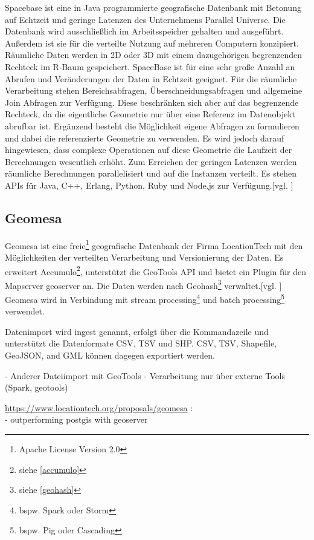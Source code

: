 Spacebase ist eine in Java programmierte geografische Datenbank mit Betonung auf Echtzeit und geringe Latenzen des Unternehmens Parallel Universe.
Die Datenbank wird ausschließlich im Arbeitsspeicher gehalten und ausgeführt.
Außerdem ist sie für die verteilte Nutzung auf mehreren Computern konzipiert.
Räumliche Daten werden in 2D oder 3D mit einem dazugehörigen begrenzenden Rechteck im R-Baum gespeichert.
SpaceBase ist für eine sehr große Anzahl an Abrufen und Veränderungen der Daten in Echtzeit geeignet.
Für die räumliche Verarbeitung stehen Bereichsabfragen, Überschneidungsabfragen und allgemeine Join Abfragen zur Verfügung.
Diese beschränken sich aber auf das begrenzende Rechteck, da die eigentliche Geometrie nur über eine Referenz im Datenobjekt abrufbar ist.
Ergänzend besteht die Möglichkeit eigene Abfragen zu formulieren und dabei die referenzierte Geometrie zu verwenden.
Es wird jedoch darauf hingewiesen, dass complexe Operationen auf diese Geometrie die Laufzeit der Berechnungen wesentlich erhöht.
Zum Erreichen der geringen Latenzen werden räumliche Berechnungen parallelisiert und auf die Instanzen verteilt.
Es stehen APIs für Java, C++, Erlang, Python, Ruby und Node.js zur Verfügung.[vgl. \cite{website:spacebase}]

\subsection{Geomesa}

Geomesa ist eine freie\footnote{Apache License Version 2.0} geografische Datenbank der Firma LocationTech mit den Möglichkeiten der verteilten Verarbeitung und Versionierung der Daten.
Es erweitert Accumulo\footnote{siehe \ref{accumulo}},  unterstützt die GeoTools API und bietet ein Plugin für den Mapserver \Gls{geoserver} an.
Die Daten werden nach Geohash\footnote{siehe \ref{geohash}} verwaltet.[vgl. \cite{website:geomesaeclipse}]\\
Geomesa wird in Verbindung mit stream processing\footnote{bspw. Spark oder Storm} und batch processing\footnote{bspw. Pig oder Cascading} verwendet.

Datenimport wird ingest genannt, erfolgt über die Kommandazeile und unterstützt die Datenformate CSV, TSV und SHP.
CSV, TSV, Shapefile, GeoJSON, and GML können dagegen exportiert werden.


- Anderer Dateiimport mit GeoTools
- Verarbeitung nur über externe Tools (Spark, geotools)


\url{https://www.locationtech.org/proposals/geomesa} :\\
- outperforming postgis with geoserver


